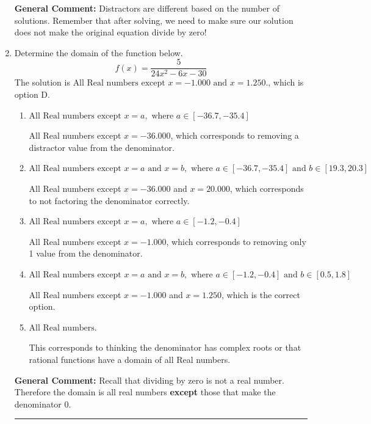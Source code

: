 \documentclass{extbook}[14pt]
\newcommand{\litem}[1]{\item #1

\rule{\textwidth}{0.4pt}}
\begin{document}
\begin{enumerate}
{\begin{enumerate}[label=\Alph*.]
\end{enumerate}

\textbf{General Comment:} Distractors are different based on the number of solutions. Remember that after solving, we need to make sure our solution does not make the original equation divide by zero!
}
\litem{
Determine the domain of the function below.
\[ f(x) = \frac{5}{24x^{2} -6 x -30} \]The solution is \( \text{All Real numbers except } x = -1.000 \text{ and } x = 1.250. \), which is option D.\begin{enumerate}[label=\Alph*.]
\item \( \text{All Real numbers except } x = a, \text{ where } a \in [-36.7, -35.4] \)

All Real numbers except $x = -36.000$, which corresponds to removing a distractor value from the denominator.
\item \( \text{All Real numbers except } x = a \text{ and } x = b, \text{ where } a \in [-36.7, -35.4] \text{ and } b \in [19.3, 20.3] \)

All Real numbers except $x = -36.000$ and $x = 20.000$, which corresponds to not factoring the denominator correctly.
\item \( \text{All Real numbers except } x = a, \text{ where } a \in [-1.2, -0.4] \)

All Real numbers except $x = -1.000$, which corresponds to removing only 1 value from the denominator.
\item \( \text{All Real numbers except } x = a \text{ and } x = b, \text{ where } a \in [-1.2, -0.4] \text{ and } b \in [0.5, 1.8] \)

All Real numbers except $x = -1.000$ and $x = 1.250$, which is the correct option.
\item \( \text{All Real numbers.} \)

This corresponds to thinking the denominator has complex roots or that rational functions have a domain of all Real numbers.
\end{enumerate}

\textbf{General Comment:} Recall that dividing by zero is not a real number. Therefore the domain is all real numbers \textbf{except} those that make the denominator 0.
}
\end{enumerate}
\end{document}
